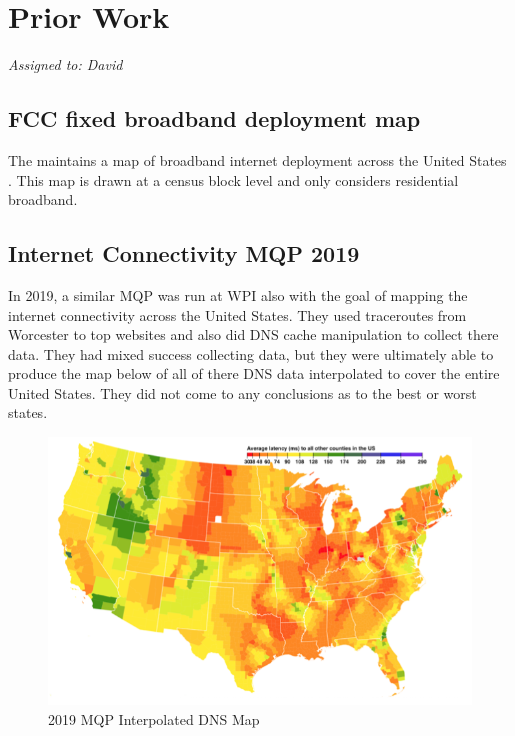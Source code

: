 \section{Prior Work}\label{sec:background_prior_work}
\textit{Assigned to: David}
\subsection{FCC fixed broadband deployment map}
 The \FCC maintains a map of broadband internet deployment across the United States \cite{FederalCommunicationsCommission}. This map is drawn at a census block level and only considers residential broadband.
 
 \subsection{Internet Connectivity MQP 2019}
In 2019, a similar MQP was run at WPI also with the goal of mapping the internet connectivity across the United States. They used traceroutes from Worcester to top websites and also did DNS cache manipulation to collect there data. They had mixed success collecting data, but they were ultimately able to produce the map below of all of there DNS data interpolated to cover the entire United States. They did not come to any conclusions as to the best or worst states. \cite{}

\begin{figure}[H]
    \centering
    \includegraphics[width=\textwidth]{images/2019_MQP_DNS_Map.png}
    \caption{2019 MQP Interpolated DNS Map}
    \label{fig:2019_MQP_DNS_Map}
\end{figure}
 
